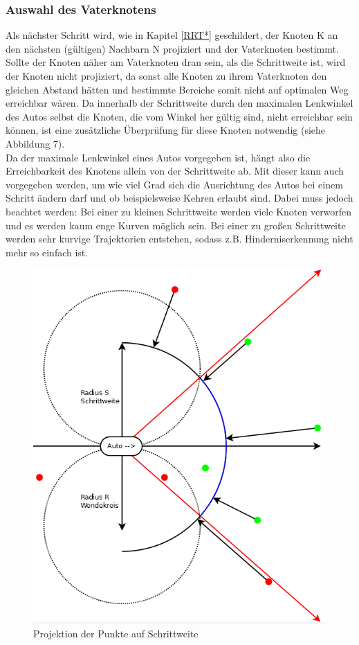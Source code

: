 \subsubsection{Auswahl des Vaterknotens}
\label{sec:Auswahl}
Als nächster Schritt wird, wie in Kapitel \ref{RRT*} geschildert, der Knoten K an den nächsten (gültigen) Nachbarn N projiziert und der Vaterknoten bestimmt. Sollte der Knoten näher am Vaterknoten dran sein, als die Schrittweite ist, wird der Knoten nicht projiziert, da sonst alle Knoten zu ihrem Vaterknoten den gleichen Abstand hätten und bestimmte Bereiche somit nicht auf optimalen Weg erreichbar wären. Da innerhalb der Schrittweite durch den maximalen Lenkwinkel des Autos selbst die Knoten, die vom Winkel her gültig sind, nicht erreichbar sein können, ist eine zusätzliche Überprüfung für diese Knoten notwendig (siehe Abbildung 7). \\
Da der maximale Lenkwinkel eines Autos vorgegeben ist, hängt also die Erreichbarkeit des Knotens allein von der Schrittweite ab. Mit dieser kann auch vorgegeben werden, um wie viel Grad sich die Ausrichtung des Autos bei einem Schritt ändern darf und ob beispielsweise Kehren erlaubt sind. Dabei muss jedoch beachtet werden: Bei einer zu kleinen Schrittweite werden viele Knoten verworfen und es werden kaum enge Kurven möglich sein. Bei einer zu großen Schrittweite werden sehr kurvige Trajektorien entstehen, sodass z.B. Hinderniserkennung nicht mehr so einfach ist.
\begin{figure}
\centering
\includegraphics[scale=0.6]{Bilder/Projektion_der_Punkte.png} 
\caption{Projektion der Punkte auf Schrittweite}
\end{figure}
